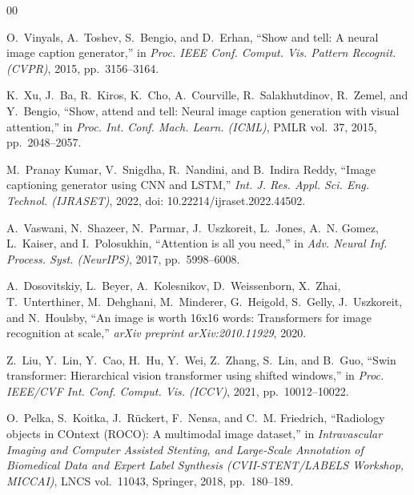 \begin{thebibliography}{00}

O.~Vinyals, A.~Toshev, S.~Bengio, and D.~Erhan, ``Show and tell: A neural image caption generator,'' in \emph{Proc. IEEE Conf. Comput. Vis. Pattern Recognit. (CVPR)}, 2015, pp.~3156--3164.

K.~Xu, J.~Ba, R.~Kiros, K.~Cho, A.~Courville, R.~Salakhutdinov, R.~Zemel, and Y.~Bengio, ``Show, attend and tell: Neural image caption generation with visual attention,'' in \emph{Proc. Int. Conf. Mach. Learn. (ICML)}, PMLR vol.~37, 2015, pp.~2048--2057.

M.~Pranay Kumar, V.~Snigdha, R.~Nandini, and B.~Indira Reddy, ``Image captioning generator using CNN and LSTM,'' \emph{Int. J. Res. Appl. Sci. Eng. Technol. (IJRASET)}, 2022, doi: 10.22214/ijraset.2022.44502.

A.~Vaswani, N.~Shazeer, N.~Parmar, J.~Uszkoreit, L.~Jones, A.~N. Gomez, L.~Kaiser, and I.~Polosukhin, ``Attention is all you need,'' in \emph{Adv. Neural Inf. Process. Syst. (NeurIPS)}, 2017, pp.~5998--6008.

A.~Dosovitskiy, L.~Beyer, A.~Kolesnikov, D.~Weissenborn, X.~Zhai, T.~Unterthiner, M.~Dehghani, M.~Minderer, G.~Heigold, S.~Gelly, J.~Uszkoreit, and N.~Houlsby, ``An image is worth 16x16 words: Transformers for image recognition at scale,'' \emph{arXiv preprint arXiv:2010.11929}, 2020.

Z.~Liu, Y.~Lin, Y.~Cao, H.~Hu, Y.~Wei, Z.~Zhang, S.~Lin, and B.~Guo, ``Swin transformer: Hierarchical vision transformer using shifted windows,'' in \emph{Proc. IEEE/CVF Int. Conf. Comput. Vis. (ICCV)}, 2021, pp.~10012--10022.

O.~Pelka, S.~Koitka, J.~Rückert, F.~Nensa, and C.~M. Friedrich, ``Radiology objects in COntext (ROCO): A multimodal image dataset,'' in \emph{Intravascular Imaging and Computer Assisted Stenting, and Large-Scale Annotation of Biomedical Data and Expert Label Synthesis (CVII-STENT/LABELS Workshop, MICCAI)}, LNCS vol.~11043, Springer, 2018, pp.~180--189.


\end{thebibliography}
